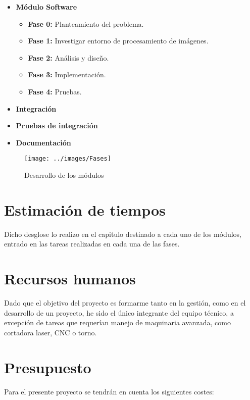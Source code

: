 \begin{itemize}
	\item \textbf{Módulo Software} 
	\begin{itemize}
		\item \textbf{Fase 0:} Planteamiento del problema.
		\item \textbf{Fase 1:} Investigar entorno de procesamiento de imágenes.
		\item \textbf{Fase 2:} Análisis y diseño.
		\item \textbf{Fase 3:} Implementación.
		\item \textbf{Fase 4:} Pruebas.
	\end{itemize}
		\item \textbf{Integración} 
		\item \textbf{Pruebas de integración}
		\item \textbf{Documentación}
\end{itemize}



\begin{figure}[h]
\centering
\texttt{[image: ../images/Fases]}
\caption{Desarrollo de los módulos}
\label{fig:Fases}
\end{figure}



\section{Estimación de tiempos}

Dicho desglose lo realizo en el capitulo destinado a cada uno de los módulos, entrado en las tareas realizadas en cada una de las fases.


\section{Recursos humanos}

Dado que el objetivo del proyecto es formarme tanto en la gestión, como en el desarrollo de un proyecto, he sido el único integrante del equipo técnico, a excepción de tareas que requerían manejo de maquinaria avanzada, como cortadora laser, CNC o torno. 

\section{Presupuesto}

Para el presente proyecto se tendrán en cuenta los siguientes costes:

